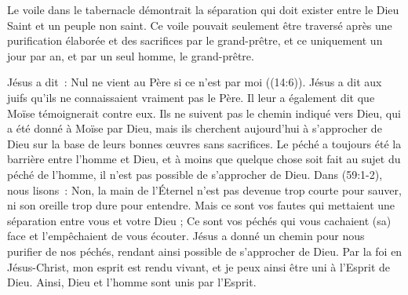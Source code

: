 Le voile dans le tabernacle démontrait la séparation qui doit exister entre le Dieu Saint et un peuple non saint. Ce voile pouvait seulement être traversé après une purification élaborée et des sacrifices par le grand-prêtre, et ce uniquement un jour par an, et par un seul homme, le grand-prêtre.

Jésus a dit~: \og Nul ne vient au Père si ce n'est par moi \fg{} ((14:6)). Jésus a dit aux juifs qu'ils ne connaissaient vraiment pas le Père. Il leur a également dit que Moïse témoignerait contre eux. Ils ne suivent pas le chemin indiqué vers Dieu, qui a été donné à Moïse par Dieu, mais ils cherchent aujourd'hui à s'approcher de Dieu sur la base de leurs bonnes œuvres sans sacrifices. Le péché a toujours été la barrière entre l'homme et Dieu, et à moins que quelque chose soit fait au sujet du péché de l'homme, il n'est pas possible de s'approcher de Dieu. Dans (59:1-2), nous lisons~: \og Non, la main de l'Éternel n'est pas devenue trop courte pour sauver, ni son oreille trop dure pour entendre. Mais ce sont vos fautes qui mettaient une séparation entre vous et votre Dieu ; Ce sont vos péchés qui vous cachaient (sa) face et l'empêchaient de vous écouter. \fg{} Jésus a donné un chemin pour nous purifier de nos péchés, rendant ainsi possible de s'approcher de Dieu. Par la foi en Jésus-Christ, mon esprit est rendu vivant, et je peux ainsi être uni à l'Esprit de Dieu. Ainsi, Dieu et l'homme sont unis par l'Esprit.

